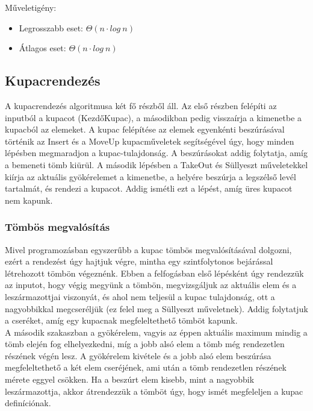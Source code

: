 \documentclass[12pt,margin=0px]{article}
\begin{document}
    \noindent Műveletigény:
    \begin{itemize}
        \item Legrosszabb eset: $\Theta(n \cdot log\ n)$
        \item Átlagos eset: $\Theta(n \cdot log\ n)$
    \end{itemize}

	\subsection*{Kupacrendezés}

    \noindent A kupacrendezés algoritmusa két fő részből áll. Az első részben felépíti az inputból a kupacot (KezdőKupac), a másodikban pedig visszaírja a kimenetbe a kupacból az elemeket. A kupac felépítése az elemek egyenkénti beszúrásával történik az Insert és a MoveUp kupacműveletek segítségével úgy, hogy minden lépésben megmaradjon a kupac-tulajdonság. A beszúrásokat addig folytatja, amíg a bemeneti tömb kiürül. A második lépésben a TakeOut és Süllyeszt műveletekkel kiírja az aktuális gyökérelemet a kimenetbe, a helyére beszúrja a  legszélső levél tartalmát, és rendezi a kupacot. Addig ismétli ezt a lépést, amíg üres kupacot nem kapunk.

    \subsubsection*{Tömbös megvalósítás}

    \noindent Mivel programozásban egyszerűbb a kupac tömbös megvalósításával dolgozni, ezért a rendezést úgy hajtjuk végre, mintha egy szintfolytonos bejárással létrehozott tömbön végeznénk. Ebben a felfogásban első lépésként úgy rendezzük az inputot, hogy végig megyünk a tömbön, megvizsgáljuk az aktuális elem és a leszármazottjai viszonyát, és ahol nem teljesül a kupac tulajdonság, ott a nagyobbikkal megcseréljük (ez felel meg a Süllyeszt műveletnek). Addig folytatjuk a cseréket, amíg egy kupacnak megfeleltethető tömböt kapunk.\\

    \noindent A második szakaszban a gyökérelem, vagyis az éppen aktuális maximum mindig a tömb elején fog elhelyezkedni, míg a jobb alsó elem a tömb még rendezetlen részének végén lesz. A gyökérelem kivétele és a jobb alsó elem beszúrása megfeleltethető a két elem cseréjének,  ami után a tömb rendezetlen részének mérete eggyel csökken. Ha a beszúrt elem kisebb, mint a nagyobbik leszármazottja, akkor átrendezzük a tömböt úgy, hogy ismét megfeleljen a kupac definíciónak.\\
\end{document}
